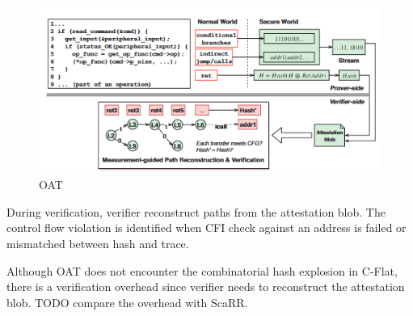 \begin{figure}[htbp]
\centerline{\includegraphics[scale=.5]{Figures/oat.png}}
\caption{OAT}
\label{fig:1-4}
\end{figure}

During verification, verifier reconstruct paths from the attestation blob. The control flow violation is identified when CFI check against an address is failed or mismatched between hash and trace.

Although OAT does not encounter the combinatorial hash explosion in C-Flat, there is a verification overhead since verifier needs to reconstruct the attestation blob. TODO compare the overhead with ScaRR.
